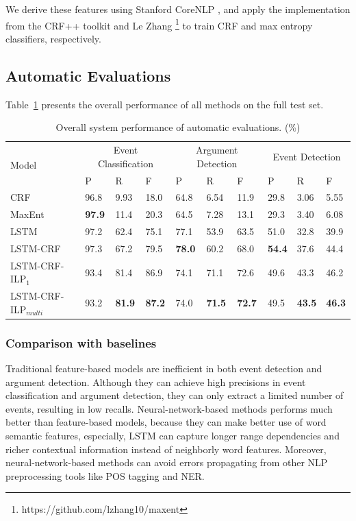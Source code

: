 \documentclass{article}
\begin{document}
We derive these features using Stanford CoreNLP \cite{manning2014stanford}, and apply the implementation from the CRF++ toolkit \cite{kudo2005crf++} and Le Zhang \footnote{https://github.com/lzhang10/maxent} to train CRF and max entropy classifiers, respectively.

\subsection{Automatic Evaluations}
Table~\ref{tab:1} presents the overall performance of all methods on the full test set. 

\begin{table}[!t]
\centering
\begin{tabular}{|l|p{0.8cm}<{\centering}|p{0.8cm}<{\centering}|p{0.8cm}<{\centering}|p{0.8cm}<{\centering}|p{0.8cm}<{\centering}|p{0.8cm}<{\centering}|p{0.8cm}<{\centering}|p{0.8cm}<{\centering}|p{0.8cm}<{\centering}|} \hline
	\multirow{2}{*}{Model} & \multicolumn{3}{c|}{Event Classification} & \multicolumn{3}{c|}{Argument Detection} & 
	\multicolumn{3}{c|}{Event Detection} \\ \cline{2-10}
	 & P & R & F & P & R & F & P & R & F \\ \hline
	CRF & 96.8 & 9.93 & 18.0 & 64.8 & 6.54 & 11.9 & 29.8 & 3.06 & 5.55 \\ \hline
	MaxEnt & \textbf{97.9} & 11.4 & 20.3 & 64.5 & 7.28 & 13.1 & 29.3 & 3.40 & 6.08 \\ \hline
	LSTM & 97.2 & 62.4 & 75.1 & 77.1 & 53.9 & 63.5 & 51.0 & 32.8 & 39.9  \\ \hline \hline
	LSTM-CRF & 97.3 & 67.2 & 79.5 & \textbf{78.0} & 60.2 & 68.0  & \textbf{54.4} & 37.6 & 44.4  \\ \hline
	LSTM-CRF-ILP$_{1}$ & 93.4 & 81.4 & 86.9 & 74.1 & 71.1 & 72.6  & 49.6 & 43.3 & 46.2 \\ \hline
	LSTM-CRF-ILP$_{multi}$ & 93.2 & \textbf{81.9} & \textbf{87.2} &  74.0 & \textbf{71.5} & \textbf{72.7} & 49.5 & \textbf{43.5} & \textbf{46.3} \\ \hline
\end{tabular}
\caption{Overall system performance of automatic evaluations. (\%) \label{tab:1}}
\end{table}

\subsubsection{Comparison with baselines}
Traditional feature-based models are inefficient in both event detection and argument detection. Although they can achieve high precisions in event classification and argument detection, they can only extract a limited number of events, resulting in low recalls. Neural-network-based methods performs much better than feature-based models, because they can make better use of word semantic features, especially, LSTM can capture longer range dependencies and richer contextual information instead of neighborly word features. Moreover, neural-network-based methods can avoid errors propagating from other NLP preprocessing tools like POS tagging and NER.
\end{document}
